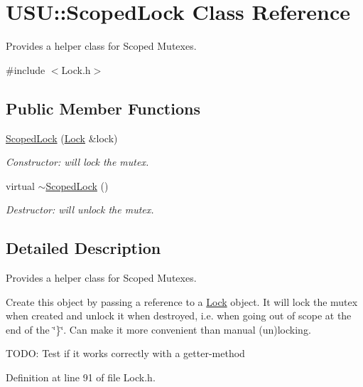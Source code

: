 \hypertarget{class_u_s_u_1_1_scoped_lock}{\section{\-U\-S\-U\-:\-:\-Scoped\-Lock \-Class \-Reference}
\label{class_u_s_u_1_1_scoped_lock}
}


\-Provides a helper class for \-Scoped \-Mutexes.  




{\ttfamily \#include $<$\-Lock.\-h$>$}

\subsection*{\-Public \-Member \-Functions}
\begin{DoxyCompactItemize}
\item 
\hyperlink{class_u_s_u_1_1_scoped_lock_aa92db605fefa48f75be29b86ad0d6186}{\-Scoped\-Lock} (\hyperlink{class_u_s_u_1_1_lock}{\-Lock} \&lock)
\begin{DoxyCompactList}\small\item\em \-Constructor\-: will lock the mutex. \end{DoxyCompactList}\item 
virtual \hyperlink{class_u_s_u_1_1_scoped_lock_a5cf581cbe18004e6fec30724c5f94071}{$\sim$\-Scoped\-Lock} ()
\begin{DoxyCompactList}\small\item\em \-Destructor\-: will unlock the mutex. \end{DoxyCompactList}\end{DoxyCompactItemize}


\subsection{\-Detailed \-Description}
\-Provides a helper class for \-Scoped \-Mutexes. 

\-Create this object by passing a reference to a \hyperlink{class_u_s_u_1_1_lock}{\-Lock} object. \-It will lock the mutex when created and unlock it when destroyed, i.\-e. when going out of scope at the end of the \char`\"{}\}\char`\"{}. \-Can make it more convenient than manual (un)locking.

\-T\-O\-D\-O\-: \-Test if it works correctly with a getter-\/method 

\-Definition at line 91 of file \-Lock.\-h.




